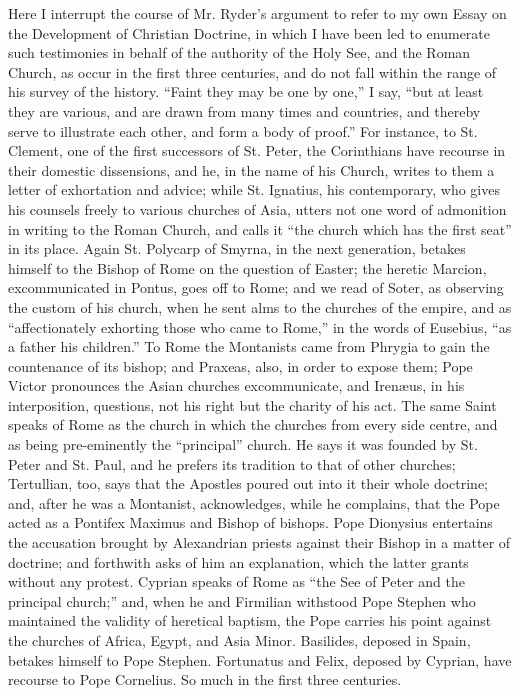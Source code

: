 Here I interrupt the course of Mr. Ryder's
argument to refer to my own Essay on the Development of Christian
Doctrine, in which I have been led to enumerate such testimonies in
behalf of the authority of the Holy See, and the Roman Church,
as occur in the first three centuries, and do not fall within the
range of his survey of the history. ``Faint they may be one by one,'' I
say, ``but at least they are various, and are drawn from many times and
countries, and thereby serve to illustrate each other, and form a body
of proof.'' For instance, to St. Clement, one of the first successors
of St. Peter, the Corinthians have recourse in their domestic
dissensions, and he, in the name of his Church, writes to them a
letter of exhortation and advice; while St. Ignatius, his
contemporary, who gives his counsels freely to various churches of
Asia, utters not one word of admonition in writing to the Roman
Church, and calls it ``the church which has the first seat'' in its
place. Again St. Polycarp of Smyrna, in the next generation, betakes
himself to the Bishop of Rome on the question of Easter; the heretic
Marcion, excommunicated in Pontus, goes off to Rome; and we read of
Soter, as observing the custom of his church, when he sent alms to the
churches of the empire, and as ``affectionately exhorting those who
came to Rome,'' in the words of Eusebius, ``as a father his children.''
To Rome the Montanists came from Phrygia to gain the countenance of
its bishop; and Praxeas, also, in order to expose them; Pope Victor
pronounces the Asian churches excommunicate, and Irenæus, in his
interposition, questions, not his right but the charity of his act.
The same Saint speaks of Rome as the church in which the churches from
every side centre, and as being pre-eminently the ``principal'' church.
He says it was founded by St. Peter and St. Paul, and he prefers its
tradition to that of other churches; Tertullian, too, says that the
Apostles poured out into it their whole doctrine; and, after he was a
Montanist, acknowledges, while he complains, that the Pope acted
as a Pontifex Maximus and Bishop of bishops. Pope Dionysius entertains
the accusation brought by Alexandrian priests against their Bishop in
a matter of doctrine; and forthwith asks of him an explanation, which
the latter grants without any protest. Cyprian speaks of Rome as ``the
See of Peter and the principal church;'' and, when he and Firmilian
withstood Pope Stephen who maintained the validity of heretical
baptism, the Pope carries his point against the churches of Africa,
Egypt, and Asia Minor. Basilides, deposed in Spain, betakes himself to
Pope Stephen. Fortunatus and Felix, deposed by Cyprian, have recourse
to Pope Cornelius. So much in the first three centuries.


